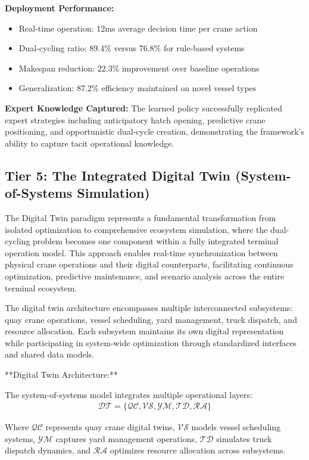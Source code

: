 \documentclass{article}
\begin{document}
\textbf{Deployment Performance:}
\begin{itemize}
\item Real-time operation: 12ms average decision time per crane action
\item Dual-cycling ratio: 89.4\% versus 76.8\% for rule-based systems
\item Makespan reduction: 22.3\% improvement over baseline operations
\item Generalization: 87.2\% efficiency maintained on novel vessel types
\end{itemize}

\textbf{Expert Knowledge Captured:}
The learned policy successfully replicated expert strategies including anticipatory hatch opening, predictive crane positioning, and opportunistic dual-cycle creation, demonstrating the framework's ability to capture tacit operational knowledge.

\subsection{Tier 5: The Integrated Digital Twin (System-of-Systems Simulation)}

The Digital Twin paradigm represents a fundamental transformation from isolated optimization to comprehensive ecosystem simulation, where the dual-cycling problem becomes one component within a fully integrated terminal operation model. This approach enables real-time synchronization between physical crane operations and their digital counterparts, facilitating continuous optimization, predictive maintenance, and scenario analysis across the entire terminal ecosystem.

The digital twin architecture encompasses multiple interconnected subsystems: quay crane operations, vessel scheduling, yard management, truck dispatch, and resource allocation. Each subsystem maintains its own digital representation while participating in system-wide optimization through standardized interfaces and shared data models.

**Digital Twin Architecture:**

The system-of-systems model integrates multiple operational layers:
\begin{align}
\mathcal{DT} = \{\mathcal{QC}, \mathcal{VS}, \mathcal{YM}, \mathcal{TD}, \mathcal{RA}\}
\end{align}

Where $\mathcal{QC}$ represents quay crane digital twins, $\mathcal{VS}$ models vessel scheduling systems, $\mathcal{YM}$ captures yard management operations, $\mathcal{TD}$ simulates truck dispatch dynamics, and $\mathcal{RA}$ optimizes resource allocation across subsystems.
\end{document}
